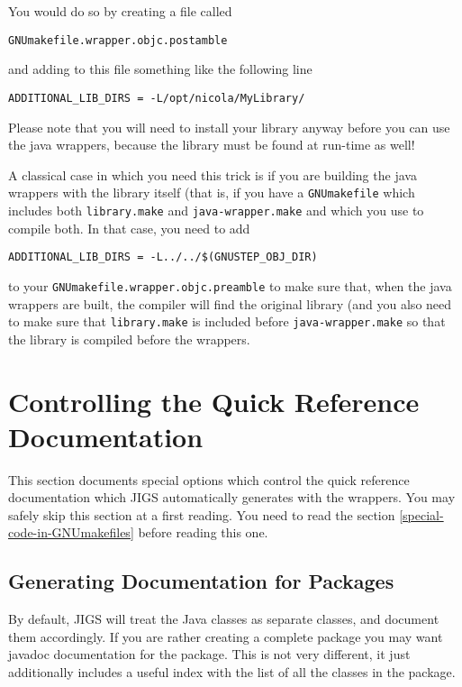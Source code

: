 You would do so by creating a file called
\begin{verbatim}
GNUmakefile.wrapper.objc.postamble
\end{verbatim}
and adding to this file something like the following line
\begin{verbatim}
ADDITIONAL_LIB_DIRS = -L/opt/nicola/MyLibrary/
\end{verbatim}
Please note that you will need to install your library anyway before
you can use the java wrappers, because the library must be found at
run-time as well!

A classical case in which you need this trick is if you are building
the java wrappers with the library itself (that is, if you have a
\texttt{GNUmakefile} which includes both \texttt{library.make} and
\texttt{java-wrapper.make} and which you use to compile both.  In that
case, you need to add
\begin{verbatim}
ADDITIONAL_LIB_DIRS = -L../../$(GNUSTEP_OBJ_DIR)
\end{verbatim}
to your \texttt{GNUmakefile.wrapper.objc.preamble} to make sure that,
when the java wrappers are built, the compiler will find the original
library (and you also need to make sure that \texttt{library.make} is
included before \texttt{java-wrapper.make} so that the library is
compiled before the wrappers.

\section{Controlling the Quick Reference Documentation}

This section documents special options which control the quick
reference documentation which JIGS automatically generates with the
wrappers.  You may safely skip this section at a first reading.  You
need to read the section \ref{special-code-in-GNUmakefiles} before
reading this one.

\subsection{Generating Documentation for Packages}
By default, JIGS will treat the Java classes as separate classes, and
document them accordingly.  If you are rather creating a complete
package you may want javadoc documentation for the package.  This is
not very different, it just additionally includes a useful index with 
the list of all the classes in the package.


